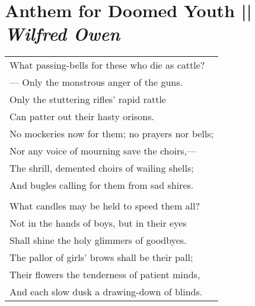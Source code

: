 
\section[Anthem for Doomed Youth ]{Anthem for Doomed Youth || \emph{Wilfred Owen} \hspace*{\fill}  \thepage}
\vspace*{2.5cm}
\begin{center}
\begin{tabular}{l}
What passing-bells for these who die as cattle?\\
\hspace{4mm} — Only the monstrous anger of the guns.\\
\hspace{4mm} Only the stuttering rifles' rapid rattle\\
Can patter out their hasty orisons.\\
No mockeries now for them; no prayers nor bells; \\
\hspace{4mm} Nor any voice of mourning save the choirs,—\\
The shrill, demented choirs of wailing shells;\\
\hspace{4mm} And bugles calling for them from sad shires.\\
\\
What candles may be held to speed them all?\\
\hspace{4mm} Not in the hands of boys, but in their eyes\\
Shall shine the holy glimmers of goodbyes.\\
\hspace{4mm} The pallor of girls' brows shall be their pall;\\
Their flowers the tenderness of patient minds,\\
And each slow dusk a drawing-down of blinds.
\end{tabular}
\end{center}